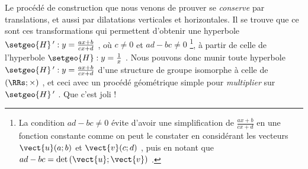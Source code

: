Le procédé de construction que nous venons de prouver se \emph{\og conserve \fg} par translations, et aussi par dilatations verticales et horizontales.
Il se trouve que ce sont ces transformations qui permettent d'obtenir une hyperbole $\setgeo{H}\,^\prime : y = \frac{a x + b}{c x + d}$ , où $c \neq 0$ et $ad - bc \neq 0$ 
\footnote{
	La condition $ad - bc \neq 0$ évite d'avoir une simplification de $\frac{a x + b}{c x + d}$ en une fonction constante comme on peut le constater en considérant les vecteurs $\vect{u}(a ; b)$ et $\vect{v}(c ; d)$ , puis en notant que $ad - bc = \det \left( \vect{u} ; \vect{v} \right)$ .  
},
à partir de celle de l'hyperbole $\setgeo{H} : y = \frac{1}{x}$ .
Nous pouvons donc munir toute hyperbole $\setgeo{H}\,^\prime : y = \frac{a x + b}{c x + d}$ d'une structure de groupe isomorphe à celle de $(\RRs ; \times)$ , et ceci avec un procédé géométrique simple pour \emph{\og multiplier \fg} sur $\setgeo{H}\,^\prime$ . Que c'est joli !
